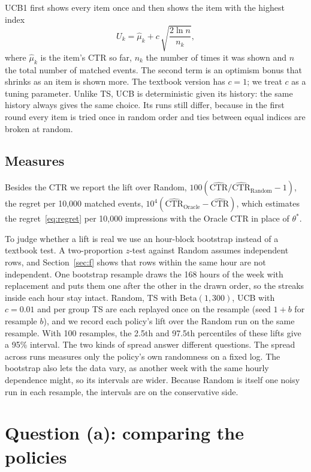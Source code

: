 \documentclass[11pt]{article}
\begin{document}
UCB1 \citep{auer2002} first shows every item once and then shows the item with
the highest index
%
\begin{equation}
  U_k = \hat\mu_k + c\,\sqrt{\frac{2\ln n}{n_k}},
  \label{eq:ucb}
\end{equation}
%
where $\hat\mu_k$ is the item's CTR so far, $n_k$ the number of times it was
shown and $n$ the total number of matched events. The second term is an
optimism bonus that shrinks as an item is shown more. The textbook version has
$c=1$; we treat $c$ as a tuning parameter. Unlike TS, UCB is deterministic
given its history: the same history always gives the same choice. Its runs
still differ, because in the first round every item is tried once in random
order and ties between equal indices are broken at random.

\subsection{Measures}

Besides the CTR we report the lift over Random,
$100(\widehat{\text{CTR}}/\widehat{\text{CTR}}_{\text{Random}} - 1)$, the
regret per 10{,}000 matched events,
$10^4(\widehat{\text{CTR}}_{\text{Oracle}} - \widehat{\text{CTR}})$, which
estimates the regret~\eqref{eq:regret} per 10{,}000 impressions with the
Oracle CTR in place of $\theta^*$.

To judge whether a lift is real we use an hour-block bootstrap instead of a
textbook test. A two-proportion $z$-test against Random assumes independent
rows, and Section~\ref{sec:f} shows that rows within the same hour are not
independent. One bootstrap resample draws the 168 hours of the week with
replacement and puts them one after the other in the drawn order, so the
streaks inside each hour stay intact. Random, TS with $\text{Beta}(1,300)$,
UCB with $c=0.01$ and per group TS are each replayed once on the resample
(seed $1+b$ for resample $b$), and we record each policy's lift over the
Random run on the same resample. With 100 resamples, the 2.5th and 97.5th
percentiles of these lifts give a 95\% interval. The two kinds of spread
answer different questions. The spread across runs measures only the
policy's own randomness on a fixed log. The bootstrap also lets the data
vary, as another week with the same hourly dependence might, so its
intervals are wider. Because Random is itself one noisy run in each
resample, the intervals are on the conservative side.

\section{Question (a): comparing the policies}
\label{sec:a}
\end{document}
